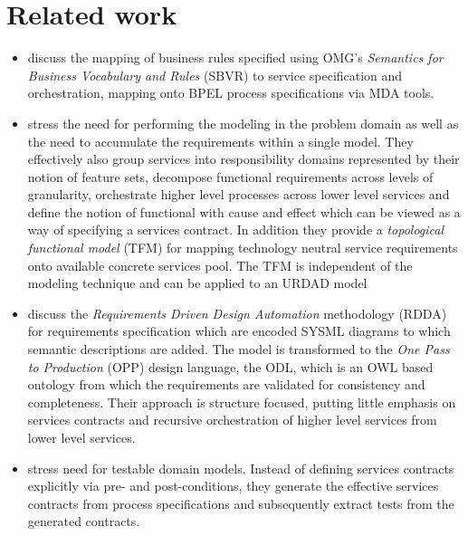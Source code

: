 \section{Related work \label{sec:relatedWork}}

\begin{itemize}
 \item \cite{iacob_model-driven_2008} discuss the mapping of business rules specified using OMG's {\em Semantics for Business Vocabulary and Rules} (SBVR) to service specification and orchestration, mapping onto BPEL process specifications via MDA tools.

  \item \cite{asnina_computation_2010} stress the need for performing the modeling in the problem domain as well as the need to accumulate the requirements within a single model. They effectively also group services into responsibility domains represented by their notion of feature sets, decompose functional requirements across levels of granularity, orchestrate higher level processes across lower level services and define the notion of functional with cause and effect which can be viewed as a way of specifying a services contract. In addition they provide a {\em topological functional model} (TFM) for mapping technology neutral service requirements onto available concrete services pool. The TFM is independent of the modeling technique and can be applied to an URDAD model

  \item \cite{cardei_model_2008} discuss the {\em Requirements Driven Design Automation} methodology (RDDA) for requirements specification which are encoded SYSML diagrams to which semantic descriptions are added. The model is transformed to the {\em One Pass to Production} (OPP) design language, the ODL, which is an OWL based ontology from which the requirements are validated for consistency and completeness. Their approach is structure focused, putting little emphasis on services contracts and recursive orchestration of higher level services from lower level services.

  \item \cite{bashardoust-tajali_extracting_2008} stress need for testable domain models. Instead of defining services contracts explicitly via pre- and post-conditions, they generate the effective services contracts from process specifications and subsequently extract tests from the generated contracts.


\end{itemize}
